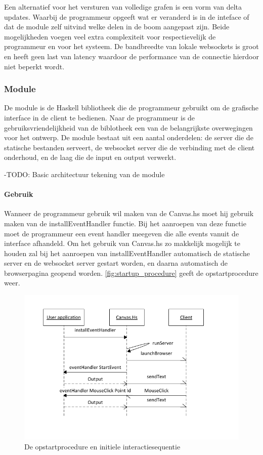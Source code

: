 Een alternatief voor het versturen van volledige grafen is een vorm van delta updates. Waarbij de programmeur opgeeft wat er veranderd is in de inteface of dat de module zelf uitvind welke delen in de boom aangepast zijn. Beide mogelijkheden voegen veel extra complexiteit voor respectievelijk de programmeur en voor het systeem. De bandbreedte van lokale websockets is groot en heeft geen last van latency waardoor de performance van de connectie hierdoor niet beperkt wordt.

\subsubsection{Module}
De module is de Haskell bibliotheek die de programmeur gebruikt om de grafische interface in de client te bedienen. Naar de programmeur is de gebruiksvriendelijkheid van de biblotheek een van de belangrijkste overwegingen voor het ontwerp. De module bestaat uit een aantal onderdelen: de server die de statische bestanden serveert, de websocket server die de verbinding met de client onderhoud, en de laag die de input en output verwerkt.

-TODO: Basic architectuur tekening van de module

\paragraph{Gebruik} Wanneer de programmeur gebruik wil maken van de Canvas.hs moet hij gebruik maken van de installEventHandler functie. Bij het aanroepen van deze functie moet de programmeur een event handler meegeven die alle events vanuit de interface afhandeld. Om het gebruik van Canvas.hs zo makkelijk mogelijk te houden zal bij het aanroepen van installEventHandler automatisch de statische server en de websocket server gestart worden, en daarna automatisch de browserpagina geopend worden. \autoref{fig:startup_procedure} geeft de opstartprocedure weer.

\begin{figure}
\begin{center}
\includegraphics[keepaspectratio,width=\textwidth]{./images/module_startup_procedure_interaction.pdf}
\caption{De opstartprocedure en initiele interactiesequentie}
\label{fig:startup_procedure}
\end{center}
\end{figure}


